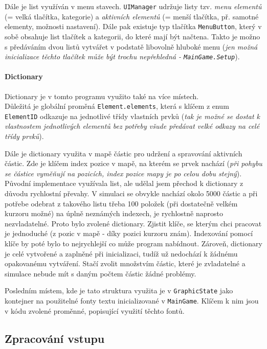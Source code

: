 \documentclass[a4paper, 12pt]{article}
\begin{document}
Dále je list využíván v menu stavech. \texttt{UIManager} udržuje listy tzv.
\emph{menu elementů} (= velká tlačítka, kategorie) a \emph{aktivních elementů}
(= menší tlačítka, př. samotné elementy, možnosti nastavení). Dále pak existuje
typ tlačítka \texttt{MenuButton}, který v sobě obsahuje list tlačítek a
kategorii, do které mají být načtena. Takto je možno s předáváním dvou listů
vytvářet v podstatě libovolně hluboké menu (\emph{jen možná inicializace těchto
tlačítek může být trochu nepřehledná - \texttt{MainGame.Setup}}).

\paragraph{Dictionary}
Dictionary je v tomto programu využito také na více místech. \\Důležitá je
globální proměná \texttt{Element.elements}, která s klíčem z enum
\texttt{ElementID} odkazuje na jednotlivé třídy vlastních prvků (\emph{tak je možné
se dostat k vlastnostem jednotlivých elementů bez potřeby všude předávat velké
odkazy na celé třídy prvků}).

Dále je dictionary využita v mapě částic pro udržení a spravování aktivních
částic. Zde je klíčem index pozice v mapě, na kterém se prvek nachází (\emph{při
pohybu se částice vyměňují na pozicích, index pozice mapy je po celou dobu
stejný}). Původní implementace využívala list, ale udělal jsem přechod k 
dictionary z důvodu rychlostní převahy. V simulaci se obvykle nachází okolo
5000 částic a při potřebe odebrat z takového listu třeba 100 položek (při
dostatečně velkém kurzoru možné) na úplně neznámých indexech, je rychlostně
naprosto nezvladatelné. Proto bylo zvolené dictionary. Zjistit klíče, se kterým
chci pracovat je jednoduché (z pozic v mapě - díky pozici kurzoru znám).
Indexování pomocí klíče by poté bylo to nejrychlejší co může program nabídnout.
Zároveň, dictionary je celé vytvořené a zaplněné při inicializaci, tudíž už
nedochází k žádnému opakovanému vytváření. Stačí zvolit množstvím částic, které
je zvladatelné a simulace nebude mít s daným počtem částic žádné problémy.

Posledním místem, kde je tato struktura využita je v \texttt{GraphicState} jako
kontejner na použitelné fonty textu inicializované v \texttt{MainGame}. Klíčem
k nim jsou v kódu zvolené proměnné, popisující využití těchto fontů.

\newpage
\subsection{Zpracování vstupu}
\end{document}
